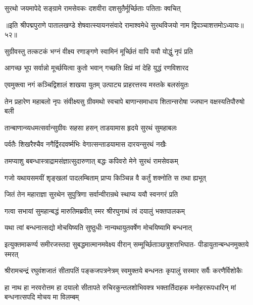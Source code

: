 \twolineshloka
{सुरथो जयमापेदे सङ्ग्रामे रामसेवकः}
{दशवीरा दशसुतैर्मूर्च्छिताः पतिताः क्वचित्}%

{॥इति श्रीपद्मपुराणे पातालखण्डे शेषवात्स्यायनसंवादे रामाश्वमेधे सुरथविजयो नाम द्विपञ्चाशत्तमोऽध्यायः॥५२॥}

\resetShloka


\twolineshloka
{सुग्रीवस्तु तत्कटकं भग्नं वीक्ष्य रणाङ्गणे}
{स्वामिनं मूर्च्छितं वापि ययौ योद्धुं नृपं प्रति}%

\twolineshloka
{आगच्छ भूप सर्वान्नो मूर्च्छयित्वा कुतो भवान्}
{गच्छति क्षिप्रं मां देहि युद्धं रणविशारद}%

\twolineshloka
{एवमुक्त्वा नगं कञ्चिद्विशालं शाखया युतम्}
{उत्पाट्य प्राहरत्तस्य मस्तके बलसंयुतः}%

\fourlineindentedshloka
{तेन प्रहारेण महाबलो नृपः}
{संवीक्ष्यसु ग्रीवमथो स्वचापे}
{बाणान्समाधाय शितान्सरोषा}
{ज्जघान वक्षस्यतिपौरुषो बली}%

\twolineshloka
{तान्बाणान्व्यधमत्सर्वान्सुग्रीवः सहसा हसन्}
{ताडयामास हृदये सुरथं सुमहाबलः}%

\twolineshloka
{पर्वतैः शिखरैश्चैव नगैर्द्विरदवर्ष्मभिः}
{वेगात्सन्ताडयामास दारयन्सुरथं नखैः}%

\twolineshloka
{तमप्याशु बबन्धास्त्राद्रामसंज्ञात्सुदारुणात्}
{बद्धः कपिवरो मेने सुरथं रामसेवकम्}%

\twolineshloka
{गजो यथायसमयीं शृङ्खलां पादलम्बिताम्}
{प्राप्य किञ्चिन्न वै कर्तुं शक्नोति स तथा ह्यभूत्}%

\twolineshloka
{जितं तेन महाराज्ञा सुरथेन सुपुत्रिणा}
{सर्वान्वीरान्रथे स्थाप्य ययौ स्वनगरं प्रति}%

\twolineshloka
{गत्वा सभायां सुमहान्बद्धं मारुतिमब्रवीत्}
{स्मर श्रीरघुनाथं त्वं दयालुं भक्तपालकम्}%

\twolineshloka
{यथा त्वां बन्धनात्सद्यो मोचयिष्यति सुष्ठुधीः}
{नान्यथायुतवर्षेण मोचयिष्यामि बन्धनात्}%

\fourlineindentedshloka
{इत्युक्तमाकर्ण्य समीरजस्तदा}
{सुबद्धमात्मानमवेक्ष्य वीरान्}
{सम्मूर्च्छिताञ्छत्रुशराभिघात-}
{पीडायुतान्बन्धनमुक्तये स्मरत्}%

\twolineshloka
{श्रीरामचन्द्रं रघुवंशजातं सीतापतिं पङ्कजपत्रनेत्रम्}
{स्वमुक्तये बन्धनतः कृपालुं सस्मार सर्वैः करणैर्विशोकैः}%


\fourlineindentedshloka
{हा नाथ हा नरवरोत्तम हा दयालो}
{सीतापते रुचिरकुन्तलशोभिवक्त्र}
{भक्तार्तिदाहक मनोहररूपधारिन्}
{मां बन्धनात्सपदि मोचय मा विलम्बम्}%

